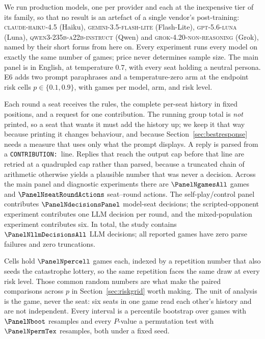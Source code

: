 We run \PanelNmodelsWord{} production models, one per provider and each at the inexpensive
tier of its family, so that no result is an artefact of a single vendor's post-training:
\textsc{claude-haiku-4.5} (Haiku), \textsc{gemini-3.5-flash-lite} (Flash-Lite),
\textsc{gpt-5.6-luna} (Luna), \textsc{qwen3-235b-a22b-instruct} (Qwen) and
\textsc{grok-4.20-non-rea\-son\-ing} (Grok), named by their short forms from here on. Every
experiment runs every model on exactly the same number of games; price never determines
sample size. The main panel is in English, at temperature $0.7$, with every seat holding a
neutral persona. E6 adds two prompt paraphrases and a temperature-zero arm at the endpoint
risk cells $p\in\{0.1,0.9\}$, with \EsixReps{} games per model, arm, and risk level.

Each round a seat receives the rules, the complete per-seat history in fixed positions, and
a request for one contribution. The running group total is \emph{not} printed, so a seat
that wants it must add the history up; we keep it that way because printing it changes
behaviour, and because Section~\ref{sec:bestresponse} needs a measure that uses only what
the prompt displays. A reply is parsed from a \texttt{CONTRIBUTION:}\ line. Replies that
reach the output cap before that line are retried at a quadrupled cap rather than parsed,
because a truncated chain of arithmetic otherwise yields a plausible number that was never
a decision. Across the main panel and diagnostic experiments there are $\PanelNgamesAll$ games and
$\PanelNseatRoundActions$ seat--round actions. The self-play/control panel contributes
$\PanelNdecisionsPanel$ model-seat decisions; the scripted-opponent experiment contributes
one LLM decision per round, and the mixed-population experiment contributes six. In total,
the study contains $\PanelNllmDecisionsAll$ LLM decisions; all reported games have zero
parse failures and zero truncations.

Cells hold $\PanelNpercell$ games each, indexed by a repetition number that also seeds the
catastrophe lottery, so the same repetition faces the same draw at every risk level.
Those common random numbers are what make the paired comparisons across $p$ in
Section~\ref{sec:riskgrid} worth making. The unit of analysis is the game, never the seat:
six seats in one game read each other's history and are not independent. Every interval is
a percentile bootstrap over games with $\PanelNboot$ resamples and every $P$-value a
permutation test with $\PanelNpermTex$ resamples, both under a fixed seed.
